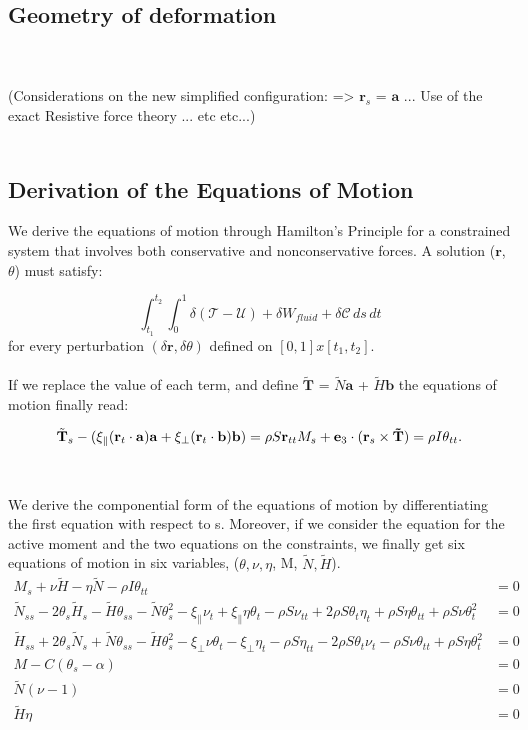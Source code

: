 \subsection{Geometry of deformation}
\\\\
(Considerations on the new simplified configuration: => $\mathbf{r}_s$ = $\mathbf{a}$ ... Use of the exact Resistive force theory  ... etc etc...)
\\\\

\subsection{Derivation of the Equations of Motion}
We derive the equations of motion through Hamilton's Principle for a constrained system that involves both conservative and nonconservative forces. A solution ($\mathbf{r}$,$\theta$) must satisfy:

\[\int_{t_1}^{t_2} \int_{0}^{1} \delta (\mathcal{T}-\mathcal{U}) + \delta W_{fluid} + \delta \mathcal{C} \, ds \,dt
\]
for every perturbation $(\delta \mathbf{r}, \delta \theta)$ defined on $[0,1]x[t_1,t_2]$. 
\\\\
If we replace the value of each term, and define $\tilde{\mathbf{T}}$ = $\tilde{N}\mathbf{a}$ + $\tilde{H}\mathbf{b}$  the equations of motion finally read:

\[ \tilde{\mathbf{T}}_s - (\xi_\parallel (\mathbf{r}_t\cdot\mathbf{a})\mathbf{a} + \xi_\perp (\mathbf{r}_t\cdot\mathbf{b})\mathbf{b}) = \rho S \mathbf{r}_{tt}\\

M_s + \mathbf{e}_3 \cdot(\mathbf{r}_s \times \mathbf{\tilde{T}}) =\rho I \theta_{tt}.
\]
\\\\
We derive the componential form of the equations of motion by differentiating the first equation with respect to s.
Moreover, if we consider the equation for the active moment and the two equations on the constraints, we finally get six equations of motion in six variables, ($\theta,\nu,\eta$, M, $\tilde{N},\tilde{H}$).
\begin{align}
M_s + \nu \tilde{H} -\eta \tilde{N} - \rho I \theta_{tt}
&= 0\\
\tilde{N}_{ss} - 2\theta_s\tilde{H}_s - \tilde{H}\theta_{ss}- \tilde{N}\theta_s^2
- \xi_{\parallel}\nu_t + \xi_{\parallel}\eta\theta_t - \rho S \nu_{tt} + 2\rho S \theta_t\eta_t + \rho S \eta\theta_{tt} + \rho S \nu\theta_t^2
&= 0\\
\tilde{H}_{ss} + 2\theta_s\tilde{N}_s + \tilde{N}\theta_{ss} - \tilde{H}\theta_s^2  - \xi_{\perp}\nu\theta_t - \xi_{\perp}\eta_t
 - \rho S \eta_{tt} - 2\rho S \theta_t\nu_t -\rho S \nu\theta_{tt} + \rho S \eta\theta_t^2
&= 0\\
M - C(\theta_s -\alpha)  &= 0\\
\tilde{N}(\nu - 1) &= 0\\
\tilde{H}\eta &= 0
\end{align}


